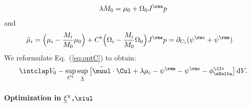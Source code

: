  \begin{align}
    \lambda M_0 = \mu_0 + \Omeganord_0 \Je p
  \end{align}
  and 
  \begin{align}
    \tilde\mu_i &= \Big(\mu_i-\frac{M_i}{M_0}\mu_0\Big) + \Ct\Big(\Omeganordi-\frac{M_i}{M_0} \Omeganord_0 \Big) \Je p = \dCi(\psic+\psim) 
  \end{align}
  We reformulate Eq.~(\ref{eq:optC}) to obtain:
  \begin{align}
    \intVO -\sup_{\Ct}\sup_{\chiul} \big[ \muultilde\cdot\Cul + \lambda \rho_\circ - \psim - \psic - \phiJJDeltas \big] \dV.
  \end{align}


  
  \paragraph{Optimization in $\underline{\xi}^{\chi}$,$\xiul$} \label{sec:optXi} %

